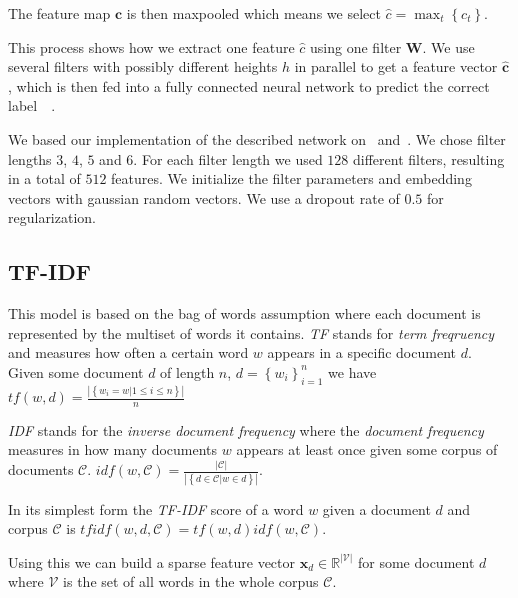 The feature map $\mathbf{c}$ is then maxpooled which means we select $\hat{c} = \max_{t}\left\{c_t\right\}$.

This process shows how we extract one feature $\hat{c}$ using one filter $\mathbf{W}$.
We use several filters with possibly different heights $h$ in parallel to get
a feature vector $\mathbf{\hat{c}}$, which is then fed into a fully connected
neural network to predict the correct label~\cite{cnn14}~\cite{cnnBlog}.

We based our implementation of the described network on~\cite{cnnBlog} and~\cite{cnnImpl}.
We chose filter lengths $3$, $4$, $5$ and $6$. For each filter length we used
$128$ different filters, resulting in a total of $512$ features.
We initialize the filter parameters and embedding vectors with gaussian
random vectors. We use a dropout rate of $0.5$ for regularization.

\subsection{TF-IDF}

This model is based on the bag of words assumption where each document is
represented by the multiset of words it contains. \textit{TF} stands for
\textit{term freqruency} and measures how often a certain word $w$ appears in
a specific document $d$. Given some document $d$ of length $n$, $d = {\left\{w_i\right\}}_{i = 1}^{n}$
we have $tf\left(w, d\right) = \frac{|\left\{w_i = w | 1 \le i \le n\right\}|}{n}$

\textit{IDF} stands for the \textit{inverse document frequency}
where the \textit{document frequency} measures in how many documents $w$ appears
at least once given some corpus of documents
$\mathcal{C}$. $idf\left(w, \mathcal{C}\right) = \frac{|\mathcal{C}|}{|\left\{d \in \mathcal{C} | w \in d\right\}|}$.

In its simplest form the \textit{TF-IDF} score of a word $w$ given a document $d$
and corpus $\mathcal{C}$ is $tfidf\left(w, d, \mathcal{C}\right) = tf\left(w, d\right)idf\left(w, \mathcal{C}\right)$.

Using this we can build a sparse feature vector $\mathbf{x}_d \in \mathbb{R}^{|\mathcal{V}|}$
for some document $d$ where $\mathcal{V}$ is the set of all words in the whole
corpus $\mathcal{C}$.

